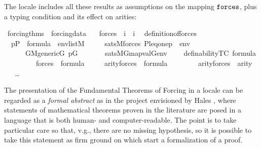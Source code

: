 The locale  includes all these results as assumptions on the
mapping $\mathop{\mathtt{forces}}$, plus a typing condition  and its
effect on arities:
\begin{isabelle}
\isamarkupfalse%
\ forcing{\isacharunderscore}thms\ {\isacharequal}\ forcing{\isacharunderscore}data\ {\isacharplus}\isanewline
\ \ forces\ {\isacharcolon}{\isacharcolon}\ {\isachardoublequoteopen}i\ {\isasymRightarrow}\ i{\isachardoublequoteclose}\isanewline
\ \
definition{\isacharunderscore}of{\isacharunderscore}forces{\isacharcolon}\isanewline 
\ \ {\isachardoublequoteopen}p{\isasymin}P\ {\isasymLongrightarrow}\ {\isasymphi}{\isasymin}formula\ {\isasymLongrightarrow}\ env{\isasymin}list{\isacharparenleft}M{\isacharparenright}\ {\isasymLongrightarrow}\isanewline
\ \ \ \  sats{\isacharparenleft}M{\isacharcomma}forces{\isacharparenleft}{\isasymphi}{\isacharparenright}{\isacharcomma}\ {\isacharbrackleft}P{\isacharcomma}leq{\isacharcomma}one{\isacharcomma}p{\isacharbrackright}\ {\isacharat}\ env{\isacharparenright}\ {\isasymlongleftrightarrow}\isanewline
\ \ \ \ \ \
{\isacharparenleft}{\isasymforall}G{\isachardot}{\isacharparenleft}M{\isacharunderscore}generic{\isacharparenleft}G{\isacharparenright}{\isasymand}\
p{\isasymin}G{\isacharparenright}\ {\isasymlongrightarrow}\isanewline 
\ \ \ \ \ \ sats{\isacharparenleft}M{\isacharbrackleft}G{\isacharbrackright}{\isacharcomma}{\isasymphi}{\isacharcomma}map{\isacharparenleft}val{\isacharparenleft}G{\isacharparenright}{\isacharcomma}env{\isacharparenright}{\isacharparenright}{\isacharparenright}{\isachardoublequoteclose}\isanewline
\ \ \isakeyword{and}\ \ definability{\isacharbrackleft}TC{\isacharbrackright}{\isacharcolon}\ {\isachardoublequoteopen}{\isasymphi}{\isasymin}formula\ {\isasymLongrightarrow}\isanewline
\ \ \ \ \ \ \ \ \  forces{\isacharparenleft}{\isasymphi}{\isacharparenright}\ {\isasymin}\ formula{\isachardoublequoteclose}\isanewline
\ \ \isakeyword{and}\ \ \ arity{\isacharunderscore}forces{\isacharcolon}\ \ {\isachardoublequoteopen}{\isasymphi}{\isasymin}formula\ {\isasymLongrightarrow}\isanewline
\ \ \ \ \ \ \
arity{\isacharparenleft}forces{\isacharparenleft}{\isasymphi}{\isacharparenright}{\isacharparenright}\
{\isacharequal}\ arity{\isacharparenleft}{\isasymphi}{\isacharparenright}\ {\isacharhash}{\isacharplus}\ {}{\isachardoublequoteclose}\isanewline
\ \ \isakeyword{and}\ \dots
\end{isabelle}

The presentation of the Fundamental Theorems of Forcing in a locale
can be regarded as a \emph{formal abstract} as in the project
envisioned by Hales \cite{fabstracts}, where  statements of
mathematical theorems proven in the literature are posed in a language
that is both human- and computer-readable. The point is to take
particular care so that, v.g., there are no missing hypothesis, so it
is possible to take this statement as firm ground on which start a
formalization of a proof. 

